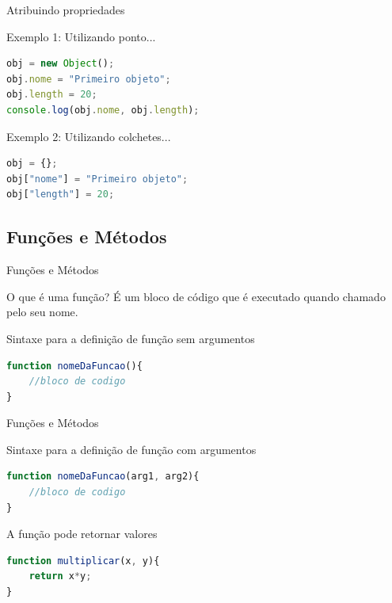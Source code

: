 \documentclass[xcolor=dvipsnames,table]{beamer}
\begin{document}
\begin{frame}[fragile]{Atribuindo propriedades}
	\begin{block}{Exemplo 1: Utilizando ponto...}
		\begin{lstlisting}[language=JavaScript]
obj = new Object();
obj.nome = "Primeiro objeto";
obj.length = 20;
console.log(obj.nome, obj.length);
\end{lstlisting}	
	\end{block} \pause
	\begin{block}{Exemplo 2: Utilizando colchetes...}
		\begin{lstlisting}[language=JavaScript]
obj = {};
obj["nome"] = "Primeiro objeto";
obj["length"] = 20;
\end{lstlisting}	
	\end{block}
\end{frame}

\subsection{Funções e Métodos}
\begin{frame}[fragile]{Funções e Métodos}
	\begin{block}{O que é uma função?}
		É um bloco de código que é executado quando chamado pelo seu nome.
	\end{block} \pause
	\begin{block}{Sintaxe para a definição de função sem argumentos}
		\begin{lstlisting}[language=JavaScript]
function nomeDaFuncao(){
	//bloco de codigo
}
\end{lstlisting}	
	\end{block}
\end{frame}

\begin{frame}[fragile]{Funções e Métodos}
	\begin{block}{Sintaxe para a definição de função com argumentos}
		\begin{lstlisting}[language=JavaScript]
function nomeDaFuncao(arg1, arg2){
	//bloco de codigo
}
\end{lstlisting}	
	\end{block} \pause
	\begin{block}{A função pode retornar valores}
		\begin{lstlisting}[language=JavaScript]
function multiplicar(x, y){
	return x*y;
}
\end{lstlisting}	
	\end{block}
\end{frame}
	
	\begin{frame}
		\titlepage
	\end{frame}
	
\end{document}
